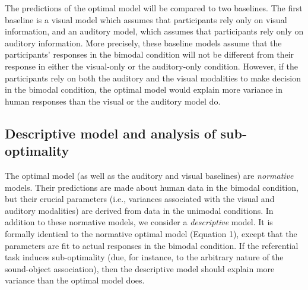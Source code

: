\documentclass[english,,man,floatsintext]{apa6}
\theoremstyle{definition}
\theoremstyle{definition}
\theoremstyle{definition}
\theoremstyle{remark}
\begin{document}
The predictions of the optimal model will be compared to two baselines.
The first baseline is a visual model which assumes that participants
rely only on visual information, and an auditory model, which assumes
that participants rely only on auditory information. More precisely,
these baseline models assume that the participants' responses in the
bimodal condition will not be different from their response in either
the visual-only or the auditory-only condition. However, if the
participants rely on both the auditory and the visual modalities to make
decision in the bimodal condition, the optimal model would explain more
variance in human responses than the visual or the auditory model do.

\subsection{Descriptive model and analysis of
sub-optimality}\label{descriptive-model-and-analysis-of-sub-optimality}

The optimal model (as well as the auditory and visual baselines) are
\emph{normative} models. Their predictions are made about human data in
the bimodal condition, but their crucial parameters (i.e., variances
associated with the visual and auditory modalities) are derived from
data in the unimodal conditions. In addition to these normative models,
we consider a \emph{descriptive} model. It is formally identical to the
normative optimal model (Equation 1), except that the parameters are fit
to actual responses in the bimodal condition. If the referential task
induces sub-optimality (due, for instance, to the arbitrary nature of
the sound-object association), then the descriptive model should explain
more variance than the optimal model does.
\end{document}
